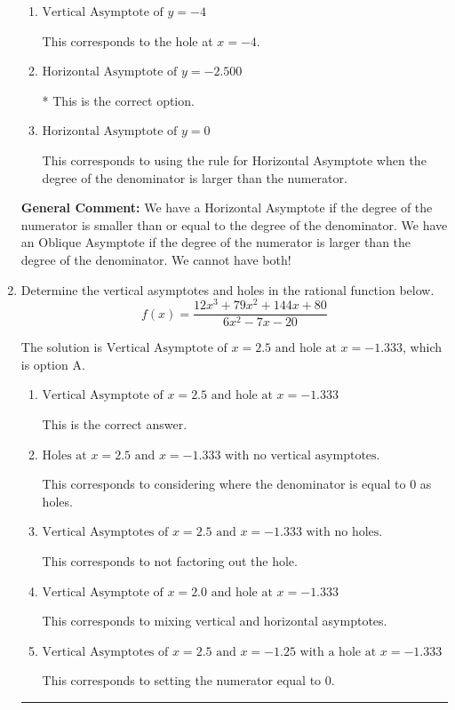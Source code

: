 \documentclass{extbook}[14pt]
\newcommand{\litem}[1]{\item #1

\rule{\textwidth}{0.4pt}}
\begin{document}
\begin{enumerate}
{\begin{enumerate}[label=\Alph*.]
This corresponds to the hole at $x = 1.000$.
\item \( \text{Vertical Asymptote of } y = -4  \)

This corresponds to the hole at $x = -4$.
\item \( \text{Horizontal Asymptote of } y = -2.500  \)

* This is the correct option.
\item \( \text{Horizontal Asymptote of } y = 0  \)

This corresponds to using the rule for Horizontal Asymptote when the degree of the denominator is larger than the numerator.
\end{enumerate}

\textbf{General Comment:} We have a Horizontal Asymptote if the degree of the numerator is smaller than or equal to the degree of the denominator. We have an Oblique Asymptote if the degree of the numerator is larger than the degree of the denominator. We cannot have both!
}
\litem{
Determine the vertical asymptotes and holes in the rational function below.
\[ f(x) = \frac{12x^{3} +79 x^{2} +144 x + 80}{6x^{2} -7 x -20} \]

The solution is \( \text{Vertical Asymptote of } x = 2.5 \text{ and hole at } x = -1.333 \), which is option A.\begin{enumerate}[label=\Alph*.]
\item \( \text{Vertical Asymptote of } x = 2.5 \text{ and hole at } x = -1.333 \)

This is the correct answer.
\item \( \text{Holes at } x = 2.5 \text{ and } x = -1.333 \text{ with no vertical asymptotes.} \)

This corresponds to considering where the denominator is equal to 0 as holes.
\item \( \text{Vertical Asymptotes of } x = 2.5 \text{ and } x = -1.333 \text{ with no holes.} \)

This corresponds to not factoring out the hole.
\item \( \text{Vertical Asymptote of } x = 2.0 \text{ and hole at } x = -1.333 \)

This corresponds to mixing vertical and horizontal asymptotes.
\item \( \text{Vertical Asymptotes of } x = 2.5 \text{ and } x = -1.25 \text{ with a hole at } x = -1.333 \)

This corresponds to setting the numerator equal to 0.
\end{enumerate}

}
\end{enumerate}
\end{document}

